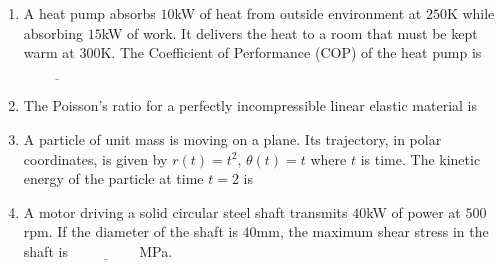 \documentclass[journal]{IEEEtran}
\begin{document}
\begin{enumerate}[leftmargin=0pt]
    \hfill{}

    \item A heat pump absorbs $10$kW of heat from outside environment at $250$K while absorbing $15$kW of work. It delivers the heat to a room that must be kept warm at $300$K. The Coefficient of Performance (COP) of the heat pump is
        $\underline{\hspace{2cm}}$

    \hfill{}

    \item The Poisson's ratio for a perfectly incompressible linear elastic material is 

    \hfill{}

    \begin{enumerate}
    \end{enumerate}

    \item A particle of unit mass is moving on a plane. Its trajectory, in polar coordinates, is given by $r(t) = t^2,\,\theta(t) = t$ where $t$ is time. The kinetic energy of the particle at time $t = 2$ is

    \hfill{}

    \begin{enumerate}
    \end{enumerate}

    \item A motor driving a solid circular steel shaft transmits $40$kW of power at $500$rpm. If the diameter of the shaft is $40$mm, the maximum shear stress in the shaft is
    $\underline{\hspace{2cm}}$MPa.

    \hfill{}


\end{enumerate}
\end{document}
